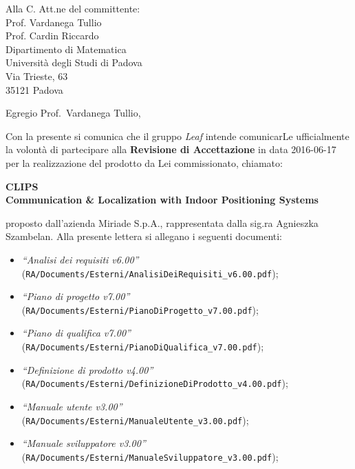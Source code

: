 \documentclass[a4paper,12pt]{letteracdp}
\author{Andrea Tombolato}
\date{16 Giugno 2016}
\begin{document}
	\begin{letter}{
		Alla C. Att.ne del committente: \\
		Prof. Vardanega Tullio \\
		Prof. Cardin Riccardo \\
		Dipartimento di Matematica \\
		Università degli Studi di Padova \\
		Via Trieste, 63 \\
		35121 Padova}
		
		\opening{Egregio Prof.~Vardanega Tullio,}
		Con la presente si comunica che il gruppo \textit{Leaf} intende comunicarLe ufficialmente la volontà di partecipare alla \textbf{Revisione di Accettazione} in data 2016-06-17 per la realizzazione del prodotto da Lei commissionato, chiamato:
\begin{center}
	\textbf{CLIPS \\ Communication \& Localization with Indoor Positioning Systems}
\end{center}
proposto dall'azienda Miriade S.p.A., rappresentata dalla sig.ra Agnieszka Szambelan.
Alla presente lettera si allegano i seguenti documenti:
%
\begin{itemize}
	\item \textit{“Analisi dei requisiti v6.00”} \\(\texttt{RA/Documents/Esterni/AnalisiDeiRequisiti\_v6.00.pdf});

	\item \textit{“Piano di progetto v7.00”} \\(\texttt{RA/Documents/Esterni/PianoDiProgetto\_v7.00.pdf});

	\item \textit{“Piano di qualifica v7.00”} \\(\texttt{RA/Documents/Esterni/PianoDiQualifica\_v7.00.pdf});
	
	\item \textit{“Definizione di prodotto v4.00”} \\(\texttt{RA/Documents/Esterni/DefinizioneDiProdotto\_v4.00.pdf});
	
	\item \textit{“Manuale utente v3.00”} \\(\texttt{RA/Documents/Esterni/ManualeUtente\_v3.00.pdf});
	
	\item \textit{“Manuale sviluppatore v3.00”} \\(\texttt{RA/Documents/Esterni/ManualeSviluppatore\_v3.00.pdf});
	

\end{itemize}
\end{letter}
\end{document}
